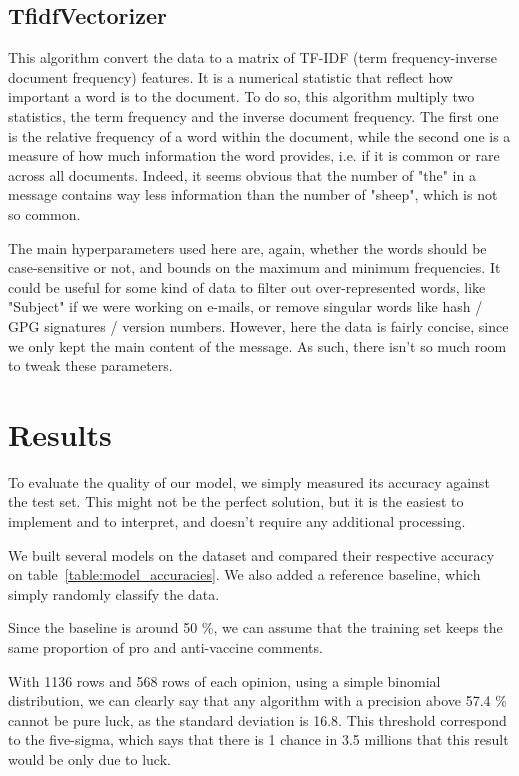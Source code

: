 \documentclass[11pt]{article}
\begin{document}
\subsection{TfidfVectorizer}

This algorithm convert the data to a matrix of TF-IDF (term frequency-inverse document frequency) features.
It is a numerical statistic that reflect how important a word is to the document.
To do so, this algorithm multiply two statistics, the term frequency and the inverse document frequency.
The first one is the relative frequency of a word within the document,
while the second one is a measure of how much information the word provides, i.e. if it is common or rare across all documents.
Indeed, it seems obvious that the number of "the" in a message contains way less
information than the number of "sheep", which is not so common.

The main hyperparameters used here are, again, whether the words should be case-sensitive or not,
and bounds on the maximum and minimum frequencies.
It could be useful for some kind of data to filter out over-represented words, like "Subject" if we were working on e-mails,
or remove singular words like hash / GPG signatures / version numbers.
However, here the data is fairly concise, since we only kept the main content of the message.
As such, there isn't so much room to tweak these parameters.

\section{Results}

To evaluate the quality of our model, we simply measured its accuracy against the test set.
This might not be the perfect solution, but it is the easiest to implement and to interpret,
and doesn't require any additional processing.

We built several models on the dataset and compared their respective accuracy on table~\ref{table:model_accuracies}.
We also added a reference baseline, which simply randomly classify the data.

Since the baseline is around 50 \%, we can assume that the training set keeps the same proportion of pro and anti-vaccine comments.

With 1136 rows and 568 rows of each opinion, using a simple binomial distribution,
we can clearly say that any algorithm with a precision above 57.4 \% cannot be pure luck, as the standard deviation is 16.8.
This threshold correspond to the five-sigma, which says that there is
1 chance in 3.5 millions that this result would be only due to luck.
\end{document}
